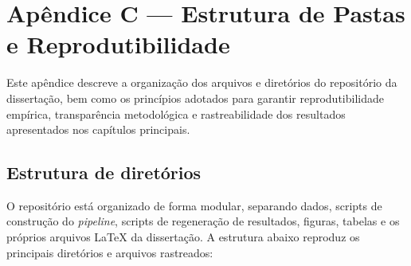 ﻿\chapter{Apêndice C — Estrutura de Pastas e Reprodutibilidade}
\label{apendiceC}

Este apêndice descreve a organização dos arquivos e diretórios do repositório da
dissertação, bem como os princípios adotados para garantir reprodutibilidade
empírica, transparência metodológica e rastreabilidade dos resultados
apresentados nos capítulos principais.

\section{Estrutura de diretórios}

O repositório está organizado de forma modular, separando dados, scripts de
construção do \textit{pipeline}, scripts de regeneração de resultados, figuras,
tabelas e os próprios arquivos \LaTeX{} da dissertação. A estrutura abaixo
reproduz os principais diretórios e arquivos rastreados:

